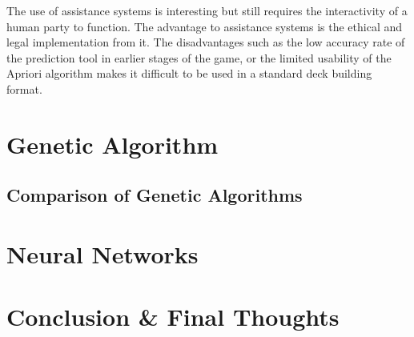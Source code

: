 \documentclass{report}
\begin{document}
The use of assistance systems is interesting but still requires the interactivity of a human party to function. The advantage to assistance systems is the ethical and legal implementation from it. The disadvantages such as the low accuracy rate of the prediction tool in earlier stages of the game, or the limited usability of the Apriori algorithm makes it difficult to be used in a standard deck building format.

\section{Genetic Algorithm}
\subsection{Comparison of Genetic Algorithms}
\section{Neural Networks}




\section{Conclusion \& Final Thoughts}



\end{document}
